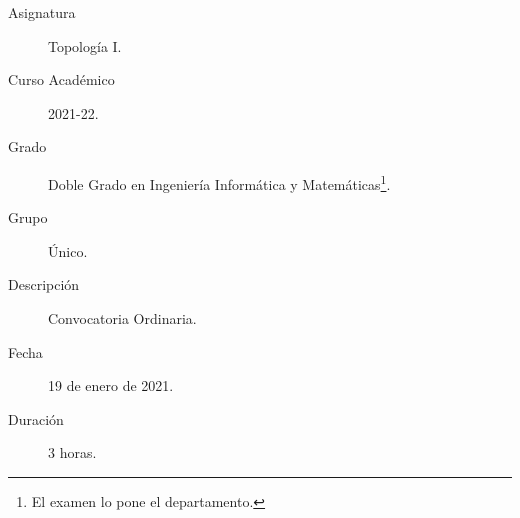 \documentclass[12pt]{article}
\begin{document}

    
    

    \begin{description}
        \item[Asignatura] Topología I.
        \item[Curso Académico] 2021-22.
        \item[Grado] Doble Grado en Ingeniería Informática y Matemáticas\footnote{El examen lo pone el departamento.}.
        \item[Grupo] Único.
        \item[Descripción] Convocatoria Ordinaria.
        \item[Fecha] 19 de enero de 2021.
        \item[Duración] 3 horas.
    
    \end{description}
    \newpage
    
\end{document}
